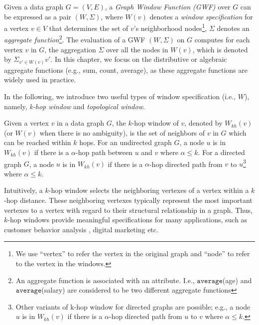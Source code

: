 Given a data graph $G = (V,E)$,
a \emph{Graph Window Function (GWF)} over $G$ can be expressed 
as a pair $(W, \Sigma)$, where 
$W(v)$ denotes a \emph{window specification} for a vertex $v \in V$ 
that determines the set of $v$'s neighborhood nodes\footnote{We use ``vertex'' to refer the vertex in the original graph and ``node'' to refer to the vertex in the windows.},
$\Sigma$ denotes an \emph{aggregate function}\footnote{An aggregate function is associated with an attribute. I.e., $\mathtt{average}$(age) and $\mathtt{average}$(salary) are considered to be two different aggregate functions}.
The evaluation of a GWF $(W, \Sigma)$ on $G$
computes for each vertex $v$ in $G$, the aggregation $\Sigma$ 
over all the nodes in $W(v)$, which is denoted by $\Sigma_{v' \in W(v)} v'$.
%
In this chapter, we focus on the distributive or algebraic aggregate functions (e.g., sum, count, average), as these aggregate functions are widely used in practice. 
 
In the following, we introduce two useful types of window specification (i.e., $W$), namely, 
\emph{k-hop window} and \emph{topological window}.


\begin{definition} 
Given a vertex $v$ in a data graph $G$, 
the $k$-hop window of $v$, denoted by $W_{kh}(v)$ (or $W(v)$ when there is no ambiguity),
is the set of neighbors of $v$ in $G$ which can be reached within $k$ hops.
For an undirected graph $G$,
a node $u$ is in $W_{kh}(v)$  if there is a $\alpha$-hop path between $u$ and $v$ where $\alpha \leqslant k$.
For a directed graph $G$,
a node $u$ is in $W_{kh}(v)$  if there is a $\alpha$-hop directed path from $v$ to $u$\footnote{
Other variants of k-hop window for directed graphs are possible; e.g.,
a node $u$ is in $W_{kh}(v)$  if there is a $\alpha$-hop directed path from $u$ to $v$ where $\alpha \leqslant k$.
} where $\alpha \leqslant k$.
\end{definition}

Intuitively, a $k$-hop window selects the neighboring vertexes of a 
vertex within a $k$-hop distance. 
These neighboring vertexes typically represent the most important 
vertexes to a vertex with regard to their structural relationship in a graph. 
Thus, $k$-hop windows provide meaningful specifications for many applications, such as customer behavior analysis \cite{briscoe2013determining,dai2012predicting} , digital marketing \cite{ma2010ego} etc.


